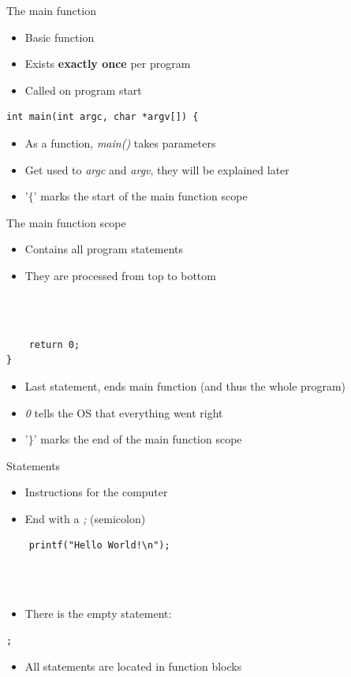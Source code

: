 \begin{frame}[fragile]{The main function}
	\begin{itemize}
		\item Basic function
		\item Exists \textbf{exactly once} per program
		\item Called on program start
	\end{itemize}
	\begin{lstlisting}
int main(int argc, char *argv[]) {
\end{lstlisting}
	\begin{itemize}
		\item As a function, \textit{main()} takes parameters
		\item Get used to \textit{argc} and \textit{argv}, they will be explained later
		\item '$\lbrace$' marks the start of the main function scope
	\end{itemize}
\end{frame}
\begin{frame}[fragile]{The main function scope}
	\begin{itemize}
		\item Contains all program statements
		\item They are processed from top to bottom
	\end{itemize} \ \\
	\ \\
	\begin{lstlisting}
	return 0;
}
\end{lstlisting}
	\begin{itemize}
		\item Last statement, ends main function (and thus the whole program)
		\item \textit{0} tells the OS that everything went right
		\item '$\rbrace$' marks the end of the main function scope
	\end{itemize}
\end{frame}
\begin{frame}[fragile]{Statements}
	\begin{itemize}
		\item Instructions for the computer
		\item End with a \textit{;} (semicolon)
	\end{itemize}
	\begin{lstlisting}
	printf("Hello World!\n");
\end{lstlisting} \ \\ \ \\
	\begin{itemize}
		\item There is the empty statement:
	\end{itemize}
	\begin{lstlisting}[numbers=none]
	;
\end{lstlisting}
	\begin{itemize}
		\item All statements are located in function blocks
	\end{itemize}
\end{frame}
